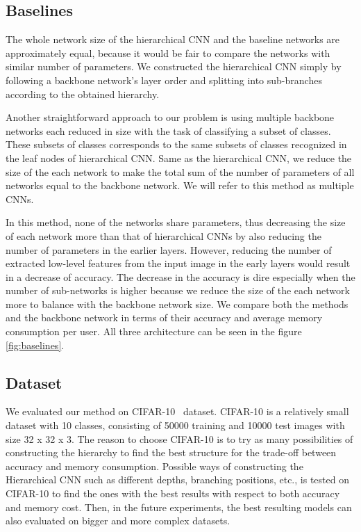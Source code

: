 \subsection{Baselines}
\label{ssec:baselines}
The whole network size of the hierarchical CNN and the baseline networks are approximately equal, because it would be fair to compare the networks with similar number of parameters. 
We constructed the hierarchical CNN simply by following a backbone network's layer order and splitting into sub-branches according to the obtained hierarchy. 

Another straightforward approach to our problem is using multiple backbone networks each reduced in size with the task of classifying a subset of classes. 
These subsets of classes corresponds to the same subsets of classes recognized in the leaf nodes of hierarchical CNN.
Same as the hierarchical CNN, we reduce the size of the each network to make the total sum of the number of parameters of all networks equal to the backbone network. 
We will refer to this method as multiple CNNs. 

In this method, none of the networks share parameters, thus decreasing the size of each network more than that of hierarchical CNNs by also reducing the number of parameters in the earlier layers. 
However, reducing the number of extracted low-level features from the input image in the early layers would result in a decrease of accuracy. 
The decrease in the accuracy is dire especially when the number of sub-networks is higher because we reduce the size of the each network more to balance with the backbone network size. 
We compare both the methods and the backbone network in terms of their accuracy and average memory consumption per user. 
All three architecture can be seen in the figure \ref{fig:baselines}.

\subsection{Dataset}

We evaluated our method on CIFAR-10~\cite{krizhevsky2009learning} dataset. 
CIFAR-10 is a relatively small dataset with 10 classes, consisting of 50000 training and 10000 test images with size 32 x 32 x 3.
The reason to choose CIFAR-10 is to try as many possibilities of constructing the hierarchy to find the best structure for the trade-off between accuracy and memory consumption.
Possible ways of constructing the Hierarchical CNN such as different depths, branching positions, etc., is tested on CIFAR-10 to find the ones with the best results with respect to both accuracy and memory cost. 
Then, in the future experiments, the best resulting models can also evaluated on bigger and more complex datasets.

